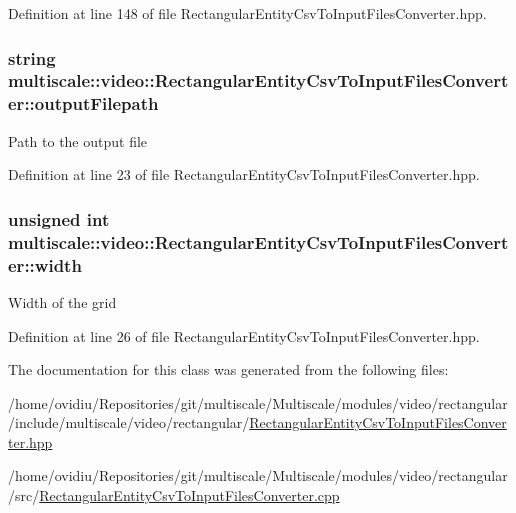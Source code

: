 Definition at line 148 of file Rectangular\-Entity\-Csv\-To\-Input\-Files\-Converter.\-hpp.

\hypertarget{classmultiscale_1_1video_1_1RectangularEntityCsvToInputFilesConverter_a84ea5fc8e195a17eb929812f962cb851}{
\subsubsection[{output\-Filepath}]{\setlength{\rightskip}{0pt plus 5cm}string multiscale\-::video\-::\-Rectangular\-Entity\-Csv\-To\-Input\-Files\-Converter\-::output\-Filepath\hspace{0.3cm}{\ttfamily [private]}}}\label{classmultiscale_1_1video_1_1RectangularEntityCsvToInputFilesConverter_a84ea5fc8e195a17eb929812f962cb851}
Path to the output file 

Definition at line 23 of file Rectangular\-Entity\-Csv\-To\-Input\-Files\-Converter.\-hpp.

\hypertarget{classmultiscale_1_1video_1_1RectangularEntityCsvToInputFilesConverter_ac4542ad4008e85ab4860146eed6e0200}{
\subsubsection[{width}]{\setlength{\rightskip}{0pt plus 5cm}unsigned int multiscale\-::video\-::\-Rectangular\-Entity\-Csv\-To\-Input\-Files\-Converter\-::width\hspace{0.3cm}{\ttfamily [private]}}}\label{classmultiscale_1_1video_1_1RectangularEntityCsvToInputFilesConverter_ac4542ad4008e85ab4860146eed6e0200}
Width of the grid 

Definition at line 26 of file Rectangular\-Entity\-Csv\-To\-Input\-Files\-Converter.\-hpp.



The documentation for this class was generated from the following files\-:\begin{DoxyCompactItemize}
\item 
/home/ovidiu/\-Repositories/git/multiscale/\-Multiscale/modules/video/rectangular/include/multiscale/video/rectangular/\hyperlink{RectangularEntityCsvToInputFilesConverter_8hpp}{Rectangular\-Entity\-Csv\-To\-Input\-Files\-Converter.\-hpp}\item 
/home/ovidiu/\-Repositories/git/multiscale/\-Multiscale/modules/video/rectangular/src/\hyperlink{RectangularEntityCsvToInputFilesConverter_8cpp}{Rectangular\-Entity\-Csv\-To\-Input\-Files\-Converter.\-cpp}\end{DoxyCompactItemize}
